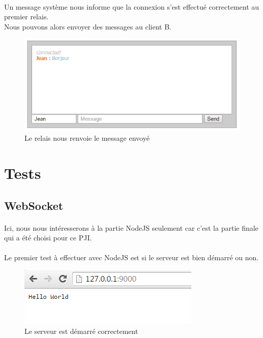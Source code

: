 \documentclass[a4paper,12pt]{report}
\begin{document}
	\paragraph*{}
	Un message système nous informe que la connexion s'est effectué correctement au premier relais. \\
	Nous pouvons alors envoyer des messages au client B.
	
	\begin{figure}[h] %
		\includegraphics[scale=0.8]{chat_message.png}
		\caption{Le relais nous renvoie le message envoyé}
		\label{project}
	\end{figure}	
	
	
\newpage	
\section{Tests}
	\subsection{WebSocket}
	\paragraph*{}
	Ici, nous nous intéresserons à la partie NodeJS seulement car c'est la partie finale qui a été choisi pour ce PJI.	
	
	\paragraph*{}
	Le premier test à effectuer avec NodeJS est si le serveur est bien démarré ou non. 
	
	\begin{figure}[h] %
		\includegraphics[scale=0.8]{started_server.png}
		\caption{Le serveur est démarré correctement}
		\label{project}
	\end{figure}
	
\end{document}

